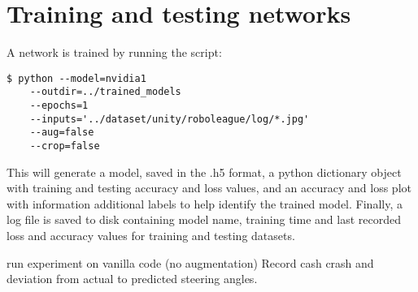 \section{Training and testing networks}
A network is trained by running the script:
\begin{verbatim}
$ python --model=nvidia1
    --outdir=../trained_models
    --epochs=1
    --inputs='../dataset/unity/roboleague/log/*.jpg'
    --aug=false
    --crop=false    
\end{verbatim}
This will generate a model, saved in the .h5 format, a python dictionary object with training and testing accuracy and loss values, and an accuracy and loss plot with information additional labels to help identify the trained model. Finally, a log file is saved to disk containing model name, training time and last recorded loss and accuracy values for training and testing datasets.

run experiment on vanilla code (no augmentation)
Record cash crash and deviation from actual to predicted steering angles.
